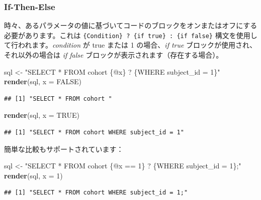 \documentclass[
  11pt]{book}
\newenvironment{Shaded}{\begin{snugshade}}{\end{snugshade}}
\newcommand{\AttributeTok}[1]{\textcolor[rgb]{0.13,0.29,0.53}{#1}}
\newcommand{\ConstantTok}[1]{\textcolor[rgb]{0.56,0.35,0.01}{#1}}
\newcommand{\DecValTok}[1]{\textcolor[rgb]{0.00,0.00,0.81}{#1}}
\newcommand{\FunctionTok}[1]{\textcolor[rgb]{0.13,0.29,0.53}{\textbf{#1}}}
\newcommand{\NormalTok}[1]{#1}
\newcommand{\OtherTok}[1]{\textcolor[rgb]{0.56,0.35,0.01}{#1}}
\newcommand{\StringTok}[1]{\textcolor[rgb]{0.31,0.60,0.02}{#1}}
\theoremstyle{definition}
\theoremstyle{definition}
\theoremstyle{definition}
\theoremstyle{definition}
\theoremstyle{remark}
\begin{document}
\subsubsection*{If-Then-Else}\label{if-then-else}

時々、あるパラメータの値に基づいてコードのブロックをオンまたはオフにする必要があります。これは \texttt{\{Condition\}\ ?\ \{if\ true\}\ :\ \{if\ false\}} 構文を使用して行われます。\emph{condition} が true または 1 の場合、\emph{if true} ブロックが使用され、それ以外の場合は \emph{if false} ブロックが表示されます（存在する場合）。

\begin{Shaded}
\begin{Highlighting}[]
\NormalTok{sql }\OtherTok{\textless{}{-}} \StringTok{"SELECT * FROM cohort \{@x\} ? \{WHERE subject\_id = 1\}"}
\FunctionTok{render}\NormalTok{(sql, }\AttributeTok{x =} \ConstantTok{FALSE}\NormalTok{)}
\end{Highlighting}
\end{Shaded}

\begin{verbatim}
## [1] "SELECT * FROM cohort "
\end{verbatim}

\begin{Shaded}
\begin{Highlighting}[]
\FunctionTok{render}\NormalTok{(sql, }\AttributeTok{x =} \ConstantTok{TRUE}\NormalTok{)}
\end{Highlighting}
\end{Shaded}

\begin{verbatim}
## [1] "SELECT * FROM cohort WHERE subject_id = 1"
\end{verbatim}

簡単な比較もサポートされています：

\begin{Shaded}
\begin{Highlighting}[]
\NormalTok{sql }\OtherTok{\textless{}{-}} \StringTok{"SELECT * FROM cohort \{@x == 1\} ? \{WHERE subject\_id = 1\};"}
\FunctionTok{render}\NormalTok{(sql, }\AttributeTok{x =} \DecValTok{1}\NormalTok{)}
\end{Highlighting}
\end{Shaded}

\begin{verbatim}
## [1] "SELECT * FROM cohort WHERE subject_id = 1;"
\end{verbatim}
\end{document}
